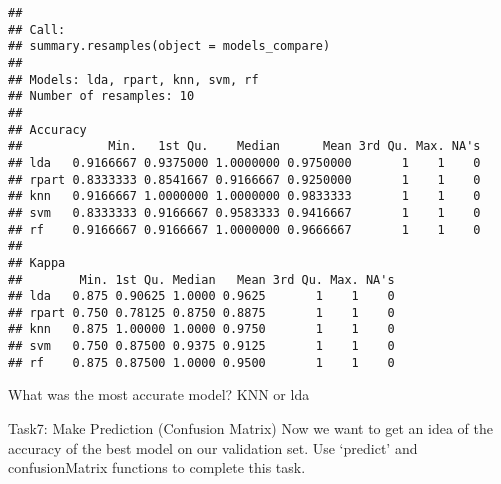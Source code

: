 \documentclass[
]{article}
\newenvironment{Shaded}{\begin{snugshade}}{\end{snugshade}}
\newcommand{\AttributeTok}[1]{\textcolor[rgb]{0.77,0.63,0.00}{#1}}
\newcommand{\CommentTok}[1]{\textcolor[rgb]{0.56,0.35,0.01}{\textit{#1}}}
\newcommand{\FunctionTok}[1]{\textcolor[rgb]{0.00,0.00,0.00}{#1}}
\newcommand{\NormalTok}[1]{#1}
\newcommand{\OtherTok}[1]{\textcolor[rgb]{0.56,0.35,0.01}{#1}}
\newcommand{\SpecialCharTok}[1]{\textcolor[rgb]{0.00,0.00,0.00}{#1}}
\begin{document}
\begin{verbatim}
## 
## Call:
## summary.resamples(object = models_compare)
## 
## Models: lda, rpart, knn, svm, rf 
## Number of resamples: 10 
## 
## Accuracy 
##            Min.   1st Qu.    Median      Mean 3rd Qu. Max. NA's
## lda   0.9166667 0.9375000 1.0000000 0.9750000       1    1    0
## rpart 0.8333333 0.8541667 0.9166667 0.9250000       1    1    0
## knn   0.9166667 1.0000000 1.0000000 0.9833333       1    1    0
## svm   0.8333333 0.9166667 0.9583333 0.9416667       1    1    0
## rf    0.9166667 0.9166667 1.0000000 0.9666667       1    1    0
## 
## Kappa 
##        Min. 1st Qu. Median   Mean 3rd Qu. Max. NA's
## lda   0.875 0.90625 1.0000 0.9625       1    1    0
## rpart 0.750 0.78125 0.8750 0.8875       1    1    0
## knn   0.875 1.00000 1.0000 0.9750       1    1    0
## svm   0.750 0.87500 0.9375 0.9125       1    1    0
## rf    0.875 0.87500 1.0000 0.9500       1    1    0
\end{verbatim}

What was the most accurate model? KNN or lda

Task7: Make Prediction (Confusion Matrix) Now we want to get an idea of
the accuracy of the best model on our validation set. Use `predict' and
confusionMatrix functions to complete this task.

\begin{Shaded}
\end{Shaded}
\end{document}
